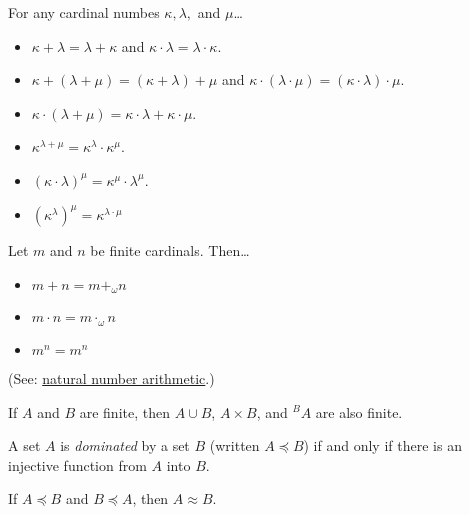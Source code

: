 \begin{proposition}
For any cardinal numbes $\kappa,\lambda,$ and $\mu$\dots
\begin{itemize}
  \item $\kappa + \lambda = \lambda + \kappa$ and $\kappa \cdot \lambda = \lambda \cdot \kappa$.
  \item $\kappa + (\lambda + \mu) = (\kappa + \lambda) + \mu$ and $\kappa \cdot (\lambda \cdot \mu) = (\kappa \cdot \lambda) \cdot \mu$.
  \item $\kappa \cdot (\lambda + \mu) = \kappa \cdot \lambda + \kappa \cdot \mu$.
  \item $\kappa^{\lambda + \mu} = \kappa^{\lambda} \cdot \kappa^{\mu}$.
  \item $(\kappa \cdot \lambda)^{\mu} = \kappa^{\mu} \cdot \lambda^{\mu}$.
  \item $(\kappa^{\lambda})^{\mu} = \kappa^{\lambda \cdot \mu}$
\end{itemize}
\end{proposition}

\begin{proposition}
Let $m$ and $n$ be finite cardinals. Then\dots
\begin{itemize}
	\item $m + n = m +_{\omega} n$
	\item $m \cdot n = m \cdot_{\omega} n$
	\item $m^n = m^n$
\end{itemize}
(See: \hyperref[arithmetic]{natural number arithmetic}.)
\end{proposition}

\begin{corollary}
If $A$ and $B$ are finite, then $A \cup B$, $A \times B$, and $^BA$ are also finite.
\end{corollary}

\label{cardinalordering}
A set $A$ is \emph{dominated}\label{dominated} by a set $B$ (written $A \preceq B$) if and only if there is an injective function from $A$ into $B$.

\begin{theorem}\label{schroderbernsteinthm}
If $A \preceq B$ and $B \preceq A$, then $A \approx B$.
\end{theorem}

